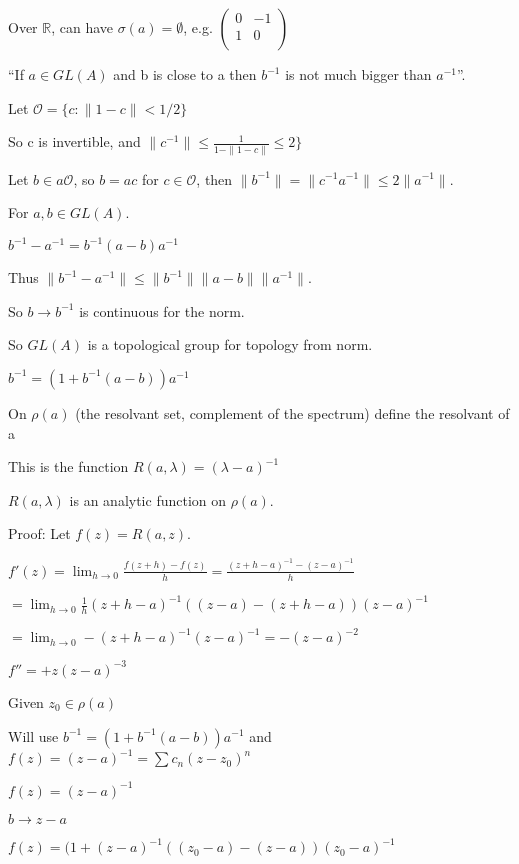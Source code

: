 \documentclass[12pt]{article}
\begin{document}
Over $\mathds{R}$, can have $\sigma(a) = \emptyset$, e.g. $\begin{pmatrix} 0 & -1 \\ 1 & 0 \\ \end{pmatrix}$

\noindent
``If $a \in GL(A)$ and b is close to a then $b^{-1}$ is not much bigger than $a^{-1}$''.

Let $\mathscr{O} = \{c : \|1 - c\| < 1\slash 2 \}$

So c is invertible, and $\|c^{-1}\| \leq \frac{1}{1 - \|1-c\|} \leq 2\}$

Let $b \in a\mathscr{O}$, so $b = ac$ for $c \in \mathscr{O}$, then $\|b^{-1}\| = \|c^{-1}a^{-1}\| \leq 2\|a^{-1}\|$.

For $a, b \in GL(A)$.

$b^{-1} - a^{-1} = b^{-1}(a - b)a^{-1}$

Thus $\|b^{-1} - a^{-1}\| \leq \|b^{-1}\|\|a - b\|\|a^{-1}\|$.

So $b \to b^{-1}$ is continuous for the norm.

So $GL(A)$ is a topological group for topology from norm.

$b^{-1} = (1 + b^{-1}(a - b))a^{-1}$

\noindent
On $\rho (a)$ (the resolvant set, complement of the spectrum) define the resolvant of a

This is the function $R(a, \lambda) = (\lambda - a)^{-1}$

\noindent
$R(a, \lambda)$ is an analytic function on $\rho (a)$.

\noindent
Proof: Let $f(z) = R(a, z)$.

$f'(z) = \lim_{h \to 0} \frac{f(z + h) - f(z)}{h} = \frac{(z + h - a)^{-1} - (z - a)^{-1}}{h}$ 

$ = \lim_{h \to 0}\frac{1}{h} (z + h - a)^{-1} ((z - a) - (z + h - a))(z - a)^{-1}$

$= \lim_{h \to 0} -(z + h - a)^{-1}(z - a)^{-1} = -(z - a)^{-2}$

$f'' = +z(z - a)^{-3}$

Given $z_0 \in \rho (a)$

Will use $b^{-1} = (1 + b^{-1}(a - b))a^{-1}$ and $f(z) = (z - a)^{-1} = \sum c_n(z - z_0)^n$

$f(z) = (z - a)^{-1}$

$b \to z - a$

$f(z) = (1 + (z - a)^{-1}((z_0 - a) - (z - a)) (z_0 - a)^{-1}$
\end{document}
